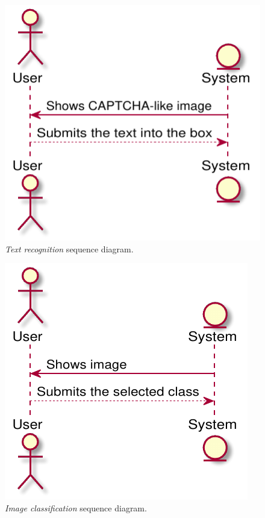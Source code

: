 \begin{figure}[h!t]
    \centering
    \includegraphics[scale=0.8]{assets/plantuml/pdf/sequence/text.pdf}
    \caption{\emph{Text recognition} sequence diagram.}
    \label{fig:sequence:text}
\end{figure}

\begin{figure}[h!t]
    \centering
    \includegraphics[scale=0.8]{assets/plantuml/pdf/sequence/image.pdf}
    \caption{\emph{Image classification} sequence diagram.}
    \label{fig:sequence:image}
\end{figure}

